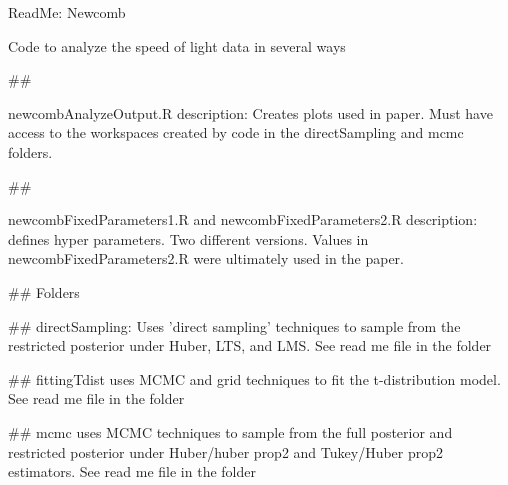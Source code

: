 ReadMe: Newcomb


Code to analyze the speed of light data in several ways


##

newcombAnalyzeOutput.R
description: Creates plots used in paper. Must have access to the workspaces created by code in the directSampling and mcmc folders. 


##

newcombFixedParameters1.R and newcombFixedParameters2.R
description: defines hyper parameters. Two different versions. Values in newcombFixedParameters2.R were ultimately used in the paper. 

##
Folders

##
directSampling: 
Uses 'direct sampling' techniques to sample from the restricted posterior under Huber, LTS, and LMS. See read me file in the folder



##
fittingTdist
uses MCMC and grid techniques to fit the t-distribution model.  See read me file in the folder

##
mcmc
uses MCMC techniques to sample from the full posterior and restricted posterior under Huber/huber prop2 and Tukey/Huber prop2 estimators. See read me file in the folder

